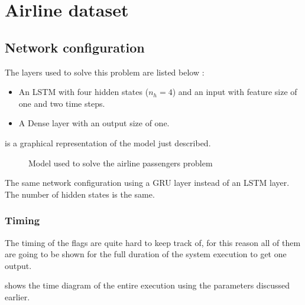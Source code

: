 \section{Airline dataset}
\label{sec:resAirline}

\subsection{Network configuration}

The layers used to solve this problem are listed below :

\begin{itemize}
  \item An \ac{LSTM} with four hidden states ($n_h=4$) and an input with feature size of one and two time steps.
  \item A Dense layer with an output size of one.
\end{itemize}

 is a graphical representation of the model just described.

\begin{figure}[H]
  \centering
  
  \caption{Model used to solve the airline passengers problem}
  \label{fig:airlineModel}
\end{figure}

The same network configuration using a \ac{GRU} layer instead of an \ac{LSTM} layer. The number of hidden states is the same.

\subsubsection{Timing}

The timing of the flags are quite hard to keep track of, for this reason all of them are going to be shown for the full duration of the system execution to get one output.

 shows the time diagram of the entire execution using the parameters discussed earlier.

